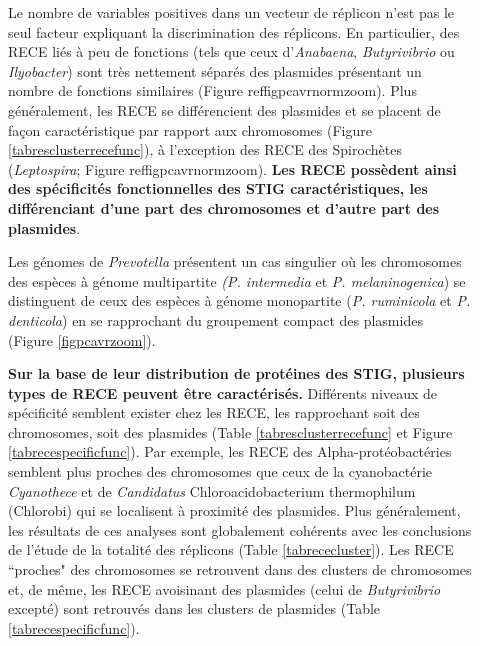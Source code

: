 \begin{description}
\item[\textbullet] Le nombre de variables positives dans un vecteur de réplicon n'est pas le seul facteur expliquant la discrimination des réplicons. En particulier, des RECE liés à peu de fonctions (tels que ceux d'\textit{Anabaena}, \textit{Butyrivibrio} ou \textit{Ilyobacter}) sont très nettement séparés des plasmides présentant un nombre de fonctions similaires (Figure ref{figpcavrnormzoom}). Plus généralement, les RECE se différencient des plasmides et se placent de façon caractéristique par rapport aux chromosomes (Figure \ref{tabresclusterrecefunc}), à l'exception des RECE des Spirochètes (\textit{Leptospira}; Figure ref{figpcavrnormzoom}). \textbf{\color{orange} Les RECE possèdent ainsi des spécificités fonctionnelles des STIG caractéristiques, les différenciant d'une part des chromosomes et d'autre part des plasmides}. 

\item[\textbullet]Les génomes de \textit{Prevotella} présentent un cas singulier où les chromosomes des espèces à génome multipartite \textit{(P. intermedia} et \textit{P. melaninogenica}) se distinguent de ceux des espèces à génome monopartite (\textit{P. ruminicola} et \textit{P. denticola}) en se rapprochant du groupement compact des plasmides (Figure \ref{figpcavrzoom}).

\item[\textbullet] \textbf{Sur la base de leur distribution de protéines des STIG, plusieurs types de RECE peuvent être caractérisés.} Différents niveaux de spécificité semblent exister chez les RECE, les rapprochant soit des chromosomes, soit des plasmides (Table \ref{tabresclusterrecefunc} et Figure \ref{tabrecespecificfunc}). Par exemple, les RECE des Alpha-protéobactéries semblent plus proches des chromosomes que ceux de la cyanobactérie \textit{Cyanothece} et de \textit{Candidatus} Chloroacidobacterium thermophilum (Chlorobi) qui se localisent à proximité des plasmides. Plus généralement, les résultats de ces analyses sont globalement cohérents avec les conclusions de l'étude de la totalité des réplicons (Table \ref{tabrececluster}). Les RECE ``proches" des chromosomes se retrouvent dans des clusters de chromosomes et, de même, les RECE avoisinant des plasmides (celui de \textit{Butyrivibrio} excepté) sont retrouvés dans les clusters de plasmides (Table \ref{tabrecespecificfunc}).


\end{description}
